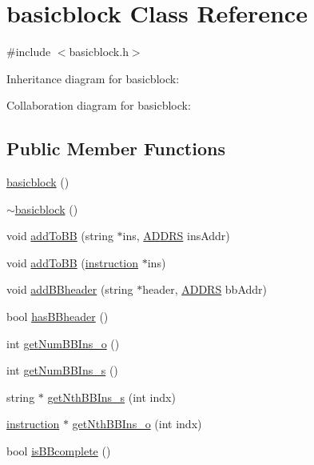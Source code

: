 \hypertarget{classbasicblock}{
\section{basicblock Class Reference}
\label{classbasicblock}
}


{\ttfamily \#include $<$basicblock.h$>$}



Inheritance diagram for basicblock:


Collaboration diagram for basicblock:
\subsection*{Public Member Functions}
\begin{DoxyCompactItemize}
\item 
\hyperlink{classbasicblock_ac6d735b981c1d367ad93f62ab0394974}{basicblock} ()
\item 
\hyperlink{classbasicblock_a9825a2fafc3b7203bdfe2b0da687bf7d}{$\sim$basicblock} ()
\item 
void \hyperlink{classbasicblock_ad7aa6001155731e9af6347220d48d702}{addToBB} (string $\ast$ins, \hyperlink{global_2global_8h_a7ea74bb9ffd2e4d41550ae2383dd25bc}{ADDRS} insAddr)
\item 
void \hyperlink{classbasicblock_ad741200a033f41ca0e08dadbbbc82060}{addToBB} (\hyperlink{classinstruction}{instruction} $\ast$ins)
\item 
void \hyperlink{classbasicblock_ac2bbc450fee2f47da180fe67b515ace3}{addBBheader} (string $\ast$header, \hyperlink{global_2global_8h_a7ea74bb9ffd2e4d41550ae2383dd25bc}{ADDRS} bbAddr)
\item 
bool \hyperlink{classbasicblock_a2acbd3c9e5af1bcfc60ed44827126d90}{hasBBheader} ()
\item 
int \hyperlink{classbasicblock_a435d01a9a4869893c0a8eaaf4f62cd22}{getNumBBIns\_\-o} ()
\item 
int \hyperlink{classbasicblock_a40ff2e382e333d5515bd55508b49247a}{getNumBBIns\_\-s} ()
\item 
string $\ast$ \hyperlink{classbasicblock_ac215ec20abf70ad5a3a6e4c086a529de}{getNthBBIns\_\-s} (int indx)
\item 
\hyperlink{classinstruction}{instruction} $\ast$ \hyperlink{classbasicblock_ae37c61e43378f8cf5e5b116217c295b1}{getNthBBIns\_\-o} (int indx)
\item 
bool \hyperlink{classbasicblock_aa3e4afae3ad78659454d5747931ee455}{isBBcomplete} ()
\item 

\end{DoxyCompactItemize}
